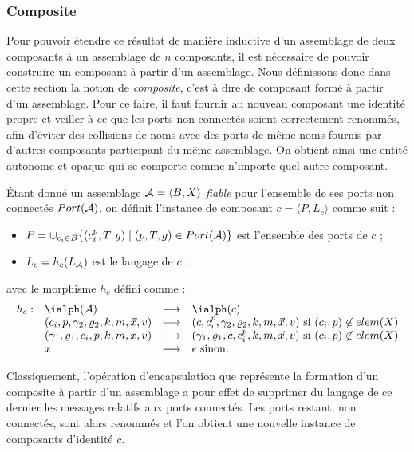 \subsubsection{Composite}

Pour pouvoir \'etendre ce r\'esultat de mani\`ere inductive d'un assemblage de deux
composants \`a un assemblage de $n$ composants, il est n\'ecessaire
de pouvoir construire un composant \`a partir d'un assemblage. Nous
d\'efinissons donc dans cette section la notion de \emph{composite},
c'est \`a dire de composant form\'e \`a partir d'un assemblage.
Pour ce faire, il faut fournir au nouveau composant 
une identit\'e propre et  veiller \`a ce que les ports non
connect\'es soient correctement renomm\'es, afin d'\'eviter des
collisions de noms avec des ports de m\^eme noms fournis par d'autres
composants participant du m\^eme assemblage.
On obtient ainsi une entit\'e autonome et opaque qui se comporte
comme n'importe quel autre composant. 

\begin{definition}[Composite]
\label{def:composite}
\'Etant donn\'e un assemblage ${\cal A} = \langle B,X\rangle$
\emph{fiable} pour l'ensemble de ses ports non connect\'es
$Port({\cal A})$, on
d\'efinit l'instance de composant $c=\langle P, L_c\rangle$ comme
suit :
\begin{itemize}
  \item $P = \cup_{c_i\in B} \{(c_i^p,T,g)\mid (p,T,g) \in Port({\cal A})\}$ est l'ensemble des ports de $c$ ;
\item $L_c = h_c(L_{\cal A})$ est le langage de $c$ ;
\end{itemize}
avec le morphisme $h_c$ d\'efini comme :
$$\begin{array}{rlcl}
h_c:&\ialph({\cal A}) &\longrightarrow& \ialph(c) \\
&(c_i,p,\gamma_2,\varrho_2,k,m,\vec{x},v)&\longmapsto&(c,c_i^p,\gamma_2,\varrho_2,k,m,\vec{x},v)
\mbox{~si~} (c_i,p) \not\in elem(X)\\
&(\gamma_1,\varrho_1,c_i,p,k,m,\vec{x},v)&\longmapsto&(\gamma_1,\varrho_1,c,c_i^p,k,m,\vec{x},v)
\mbox{~si~} (c_i,p) \not\in elem(X)\\
&x&\longmapsto&\epsilon\mbox{~sinon.}
\end{array}$$
\end{definition}

Classiquement, l'op\'eration d'encapsulation que repr\'esente la
formation d'un composite \`a partir d'un assemblage a pour effet de
supprimer du langage de ce dernier les messages relatifs aux ports
connect\'es. Les ports restant, non connect\'es, sont alors
renomm\'es et l'on obtient une nouvelle instance de composants
d'identit\'e $c$.

